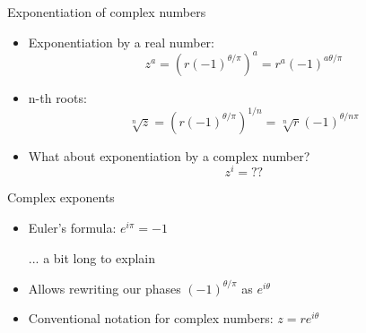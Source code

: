 \documentclass[aspectratio=169,12pt]{beamer}
\begin{document}
\begin{frame}{Exponentiation of complex numbers}

  \begin{center}
  \begin{itemize}
    \item Exponentiation by a real number:
    \begin{equation*}
      z^a = \left( r (-1)^{\theta/\pi} \right)^a = r^a (-1)^{a\theta/\pi}
    \end{equation*}
    \item n-th roots:
    \begin{equation*}
      \sqrt[n]{z} = \left( r (-1)^{\theta/\pi} \right) ^{1/n} = \sqrt[n]{r} (-1)^{\theta/n\pi}
    \end{equation*}
    \bigskip
    \item What about exponentiation by a complex number?
    \begin{equation*}
      z^i = ??
    \end{equation*}
  \end{itemize}
  \end{center}

\end{frame}

\begin{frame}{Complex exponents}

  \begin{center}
  \begin{itemize}
    \item Euler's formula: \hspace{5mm} $\boxed{e^{i\pi} = -1}$ 
    \begin{flushright}
      ... a bit long to explain
    \end{flushright}
    \bigskip
    \item Allows rewriting our phases $(-1)^{\theta/\pi}$ as $e^{i\theta}$
    \bigskip
    \item Conventional notation for complex numbers: \hspace{5mm} $\boxed{z = r e^{i\theta}}$
  \end{itemize}
  \end{center}

\end{frame}
\end{document}
